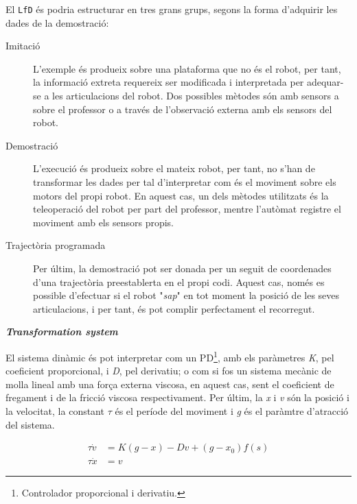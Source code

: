 \documentclass[12pt,a4paper,final,twoside]{article}
\begin{document}
El \texttt{LfD} és podria estructurar en tres grans grups, segons la forma d'adquirir les dades de la demostració:
\begin{description}

\item[Imitació] L'exemple és produeix sobre una plataforma que no és el robot, per tant, la informació extreta requereix ser modificada i interpretada per adequar-se a les articulacions del robot. Dos possibles mètodes són amb sensors a sobre el professor o a través de l'observació externa amb els sensors del robot.

\item[Demostració] L'execució és produeix sobre el mateix robot, per tant, no s'han de transformar les dades per tal d'interpretar com és el moviment sobre els motors del propi robot. En aquest cas, un dels mètodes utilitzats és la teleoperació del robot per part del professor, mentre l'autòmat registre el moviment amb els sensors propis.

\item[Trajectòria programada] Per últim, la demostració pot ser donada per un seguit de coordenades d'una trajectòria preestablerta en el propi codi. Aquest cas, només es possible d'efectuar si el robot "\textit{sap}" en tot moment la posició de les seves articulacions, i per tant, és pot complir perfectament el recorregut. 

\end{description}

\vspace{20pt}
\textbf{\textit{Transformation system}}

El sistema dinàmic és pot interpretar com un PD\footnote{Controlador proporcional i derivatiu.}, amb els paràmetres \textit{K}, pel coeficient proporcional, i \textit{D}, pel derivatiu; o com si fos un sistema mecànic de molla lineal amb una força externa viscosa, en aquest cas, sent el coeficient de fregament i de la fricció viscosa respectivament. Per últim, la \textit{x} i \textit{v} són la posició i la velocitat, la constant $\tau$ és el període del moviment i \textit{g} és el paràmtre d'atracció del sistema.

\begin{align}
\tau \dot{v} &= K(g - x) - Dv + (g - x_0)f(s)\label{eq:tau-v-dot-DMP}\\
\tau \dot{x} &= v\label{eq:tau-x-dot=v}
\end{align}
\end{document}
